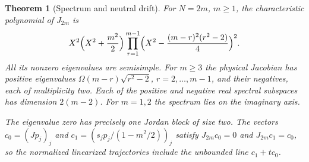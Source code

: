 \documentclass[aps,pra,onecolumn,superscriptaddress,nofootinbib,10pt]{revtex4-2}
\newtheorem{theorem}{Theorem}
\theoremstyle{definition}
\theoremstyle{remark}
\begin{document}
\begin{theorem}[Spectrum and neutral drift]
\label{ob:vortexspectrum}
For $N=2m$, $m\ge1$, the characteristic polynomial of $J_{2m}$ is
\[
 X^2\Bigl(X^2+\frac{m^2}{2}\Bigr)
 \prod_{r=1}^{m-1}
 \Bigl(X^2-\frac{(m-r)^2(r^2-2)}4\Bigr)^2.
\]
All its nonzero eigenvalues are semisimple. For $m\ge3$ the physical
Jacobian has positive eigenvalues $\Omega(m-r)\sqrt{r^2-2}$,
$r=2,\ldots,m-1$, and their negatives, each of multiplicity two.
Each of the positive and negative real spectral subspaces has dimension
$2(m-2)$. For $m=1,2$ the spectrum lies on the imaginary axis.

The eigenvalue zero has precisely one Jordan block of size two.
The vectors $c_0=(Jp_j)_j$ and $c_1=(s_jp_j/(1-m^2/2))_j$ satisfy
$J_{2m}c_0=0$ and $J_{2m}c_1=c_0$, so the normalized
linearized trajectories include the unbounded line $c_1+t c_0$.
\end{theorem}
\end{document}
